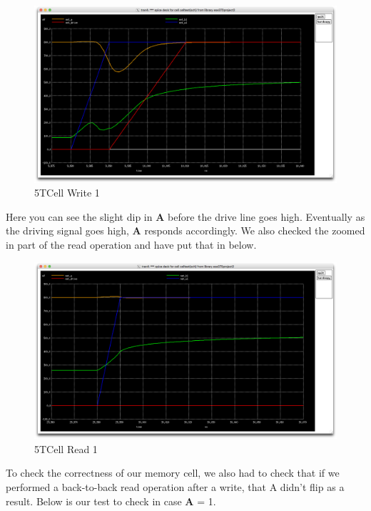 \documentclass[a4paper]{article}
\begin{document}
 \begin{figure}[H]
	\centering
	\includegraphics[scale=0.12]{5TWrite1}
	\caption{5TCell Write 1}
	\label{fig:5TWrite1}
\end{figure}

Here you can see the slight dip in \textbf{A} before the drive line goes high. Eventually as the driving signal goes high, \textbf{A} responds accordingly. We also checked the zoomed in part of the read operation and have put that in below.

 \begin{figure}[H]
	\centering
	\includegraphics[scale=0.12]{5TRead1}
	\caption{5TCell Read 1}
	\label{fig:5TRead1}
\end{figure}

To check the correctness of our memory cell, we also had to check that if we performed a back-to-back read operation after a write, that A didn't flip as a result. Below is our test to check in case \textbf{A} = 1.
\end{document}
